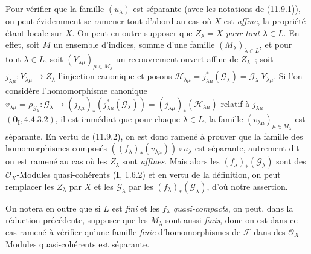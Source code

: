 \begin{env}[11.9.3]
\label{IV.11.9.3-fr}
Pour vérifier que la famille $(u_\lambda)$ est séparante (avec les notations de
(11.9.1)), on peut évidemment se ramener tout d'abord au cas où $X$ est
\emph{affine}, la propriété étant locale sur $X$. On peut en outre supposer que
$Z_\lambda=X$ \emph{pour tout} $\lambda\in L$. En effet, soit $M$ un ensemble
d'indices, somme d'une famille $(M_\lambda)_{\lambda\in L}$, et pour tout
$\lambda\in L$, soit $(Y_{\lambda\mu})_{\mu\in M_\lambda}$ un recouvrement
ouvert affine de $Z_\lambda$~; soit
$j_{\lambda\mu}:Y_{\lambda\mu}\to Z_\lambda$ l'injection canonique et posons
$\mathcal H_{\lambda\mu}=j_{\lambda\mu}^*(\mathcal G_\lambda)
=\mathcal G_\lambda|Y_{\lambda\mu}$. Si l'on considère l'homomorphisme
canonique
$v_{\lambda\mu}=\rho_{\mathcal G_\lambda}:\mathcal G_\lambda\to
(j_{\lambda\mu})_*(j_{\lambda\mu}^*(\mathcal G_\lambda))
=(j_{\lambda\mu})_*(\mathcal H_{\lambda\mu})$ relatif à $j_{\lambda\mu}$
$(\mathbf 0_{\mathrm I},4.4.3.2)$, il est immédiat que pour chaque
$\lambda\in L$, la famille $(v_{\lambda\mu})_{\mu\in M_\lambda}$ est
séparante. En vertu de (11.9.2), on est donc ramené à prouver que la famille des
homomorphismes composés $((f_\lambda)_*(v_{\lambda\mu}))\circ u_\lambda$ est
séparante, autrement dit on est ramené au cas où les $Z_\lambda$ sont \emph{affines}.
Mais alors les $(f_\lambda)_*(\mathcal G_\lambda)$ sont des
$\mathcal O_X$-Modules quasi-cohérents (\textbf I, 1.6.2) et en vertu de la
définition, on peut remplacer les $Z_\lambda$ par $X$ et les
$\mathcal G_\lambda$ par les $(f_\lambda)_*(\mathcal G_\lambda)$, d'où notre
assertion.

On notera en outre que si $L$ est \emph{fini} et les $f_\lambda$
\emph{quasi-compacts}, on peut, dans la réduction précédente, supposer que les
$M_\lambda$ sont aussi \emph{finis}, donc on est dans ce cas ramené à vérifier
qu'une famille \emph{finie} d'homomorphismes de $\mathcal F$ dans des
$\mathcal O_X$-Modules quasi-cohérents est séparante.
\end{env}

